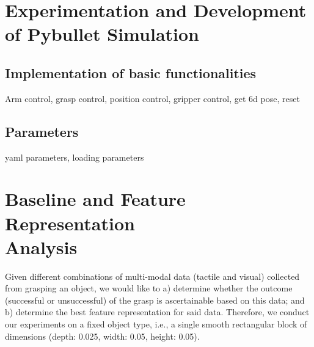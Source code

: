 \documentclass[12pt, a4paper]{report}
\theoremstyle{definition}
\begin{document}
\chapter{Experimentation and Development of Pybullet Simulation}
\label{chap:3}


\section{Implementation of basic functionalities}
Arm control, grasp control, position control, gripper control, get 6d pose, reset


\section{Parameters}
yaml parameters, loading parameters


\chapter{Baseline and Feature Representation \\ Analysis}
\label{chap:4}
Given different combinations of multi-modal data (tactile and visual) collected from grasping an object, we would like to a) determine whether the outcome (successful or unsuccessful) of the grasp is ascertainable based on this data; and b) determine the best feature representation for said data. Therefore, we conduct our experiments on a fixed object type, i.e., a single smooth rectangular block of dimensions (depth: 0.025, width: 0.05, height: 0.05).
\end{document}
